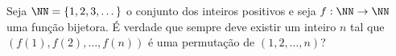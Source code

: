 Seja $\NN = \{1, 2, 3, \dots\}$ o conjunto dos inteiros positivos e seja $f: \NN \to \NN$ uma função bijetora. É verdade que sempre deve existir um inteiro $n$ tal que $(f(1), f(2), \dots, f(n))$ é uma permutação de $(1, 2, \dots, n)$?
